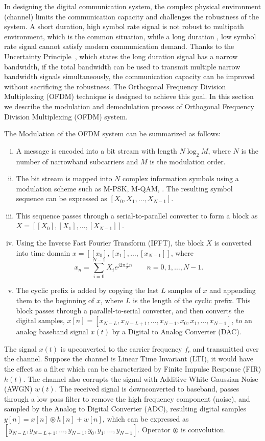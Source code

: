 In designing the digital communication system, the complex physical environment (channel) limits the communication capacity and challenges the robustness of the system. A short duration, high symbol rate signal is not robust to multipath environment, which is the common situation, while a long duration , low symbol rate signal cannot satisfy modern communication demand. Thanks to the Uncertainty Principle~\cite{BibEntry2021Dec}, which states the long duration signal has a narrow bandwidth, if the total bandwidth can be used to transmit multiple narrow bandwidth signals simultaneously, the communication capacity can be improved without sacrificing the robustness. The Orthogonal Frequency Division Multiplexing (OFDM) technique is designed to achieve this goal.
In this section we describe the modulation and demodulation process of Orthogonal Frequency Division Multiplexing (OFDM) system.

The Modulation of the OFDM system can be summarized as follows:
\begin{enumerate}[(i)]
    \item A message is encoded into a bit stream with length $N\log_2M$, where $N$ is the number of narrowband subcarriers and $M$ is the modulation order.
    \item The bit stream is mapped into $N$ complex information symbols using a modulation scheme such as M-PSK, M-QAM, \etc. The resulting symbol sequence can be expressed as $[X_{0}, X_{1}, \ldots, X_{N-1}]$.
    \item This sequence passes through a serial-to-parallel converter to form a block as $X = [[X_{0}], [X_{1}], \ldots, [X_{N-1}]]$.
    \item Using the Inverse Fast Fourier Transform (IFFT), the block $X$ is converted into time domain $x = [[x_0], [x_1], \allowbreak \ldots, [x_{N-1}]]$, where
    \[ x_n = \sum_{i=0}^{N-1}X_i e^{j2\pi\frac{i}{N}n} \qquad n=0,1,\ldots,N-1. \]
    \item The cyclic prefix is added by copying the last $L$ samples of $x$ and appending them to the beginning of $x$, where $L$ is the length of the cyclic prefix. This block passes through a parallel-to-serial converter, and then converts the digital samples, $x[n] = [x_{N-L}, x_{N-L+1}, \ldots, x_{N-1}, x_0, x_1, \ldots, x_{N-1}]$, to an analog baseband signal $x(t)$ by a Digital to Analog Converter (DAC).
\end{enumerate}

The signal $x(t)$ is upconverted to the carrier frequency $f_c$ and transmitted over the channel. Suppose the channel is Linear Time Invariant (LTI), it would have the effect as a filter which can be characterized by Finite Impulse Response (FIR) $h(t)$. The channel also corrupts the signal with Additive White Gaussian Noise (AWGN) $w(t)$. The received signal is downconverted to baseband, passes through a low pass filter to remove the high frequency component (noise), and sampled by the Analog to Digital Converter (ADC), resulting digital samples $y[n] = x[n] \circledast h[n] +  w[n]$, which can be expressed as $[y_{N-L}, y_{N-L+1}, \ldots, y_{N-1}, y_0, y_1, \ldots, y_{N-1}]$. Operator $\circledast$ is convolution.

